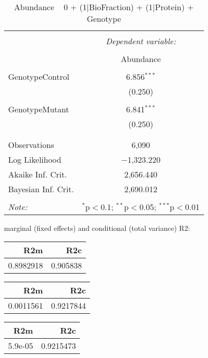 \documentclass[11pt]{report}
\begin{document}
\begin{table}[!htbp] \centering 
  \caption{Abundance ~ 0 + (1|BioFraction) + (1|Protein) + Genotype} 
  \label{} 
\begin{tabular}{@{\extracolsep{5pt}}lc} 
\\[-1.8ex]\hline 
\hline \\[-1.8ex] 
 & \multicolumn{1}{c}{\textit{Dependent variable:}} \\ 
\cline{2-2} 
\\[-1.8ex] & Abundance \\ 
\hline \\[-1.8ex] 
 GenotypeControl & 6.856$^{***}$ \\ 
  & (0.250) \\ 
  & \\ 
 GenotypeMutant & 6.841$^{***}$ \\ 
  & (0.250) \\ 
  & \\ 
\hline \\[-1.8ex] 
Observations & 6,090 \\ 
Log Likelihood & $-$1,323.220 \\ 
Akaike Inf. Crit. & 2,656.440 \\ 
Bayesian Inf. Crit. & 2,690.012 \\ 
\hline 
\hline \\[-1.8ex] 
\textit{Note:}  & \multicolumn{1}{r}{$^{*}$p$<$0.1; $^{**}$p$<$0.05; $^{***}$p$<$0.01} \\ 
\end{tabular} 
\end{table} 
marginal (fixed effects) and conditional (total variance) R2:

\begin{tabular}{r|r}
\hline
R2m & R2c\\
\hline
0.8982918 & 0.905838\\
\hline
\end{tabular}

\begin{tabular}{r|r}
\hline
R2m & R2c\\
\hline
0.0011561 & 0.9217844\\
\hline
\end{tabular}

\begin{tabular}{r|r}
\hline
R2m & R2c\\
\hline
5.9e-05 & 0.9215473\\
\hline
\end{tabular}
\end{document}

